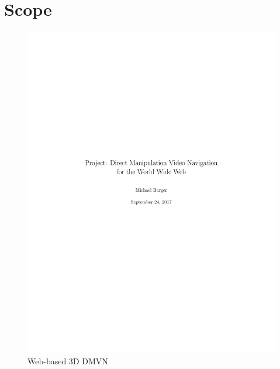 
\chapter{Scope}

\begin{figure}[h]
\centering
\includegraphics[width=\textwidth]{DMVN}
\caption{Web-based 3D DMVN}
\end{figure}

